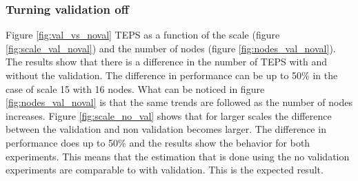 \subsubsection{Turning validation off}
\label{sec:noval}
 Figure \ref{fig:val_vs_noval} TEPS as a function of the scale (figure \ref{fig:scale_val_noval}) and the number of nodes (figure \ref{fig:nodes_val_noval}). The results show that there is a difference in the number of TEPS with and without the validation. The difference in performance can be up to 50\% in the case of scale 15 with 16 nodes. What can be noticed in figure \ref{fig:nodes_val_noval} is that the same trends are followed as the number of nodes increases.
 Figure \ref{fig:scale_no_val} shows that for larger scales the difference between the validation and non validation becomes larger.
The difference in performance does up to 50\% and the results show the behavior for both experiments. This means that the estimation that is done using the no validation experiments are comparable to with validation. This is the expected result. 
